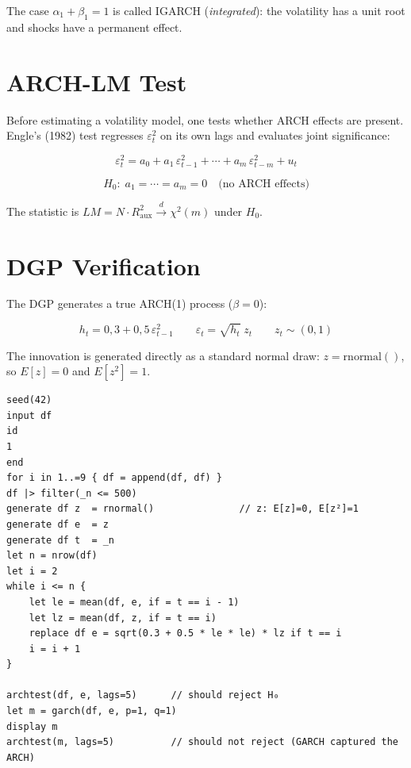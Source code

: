 The case $\alpha_1 + \beta_1 = 1$ is called IGARCH (\emph{integrated}): the
volatility has a unit root and shocks have a permanent effect.

\section{ARCH-LM Test}

Before estimating a volatility model, one tests whether ARCH effects are
present. Engle's (1982) test regresses $\varepsilon_t^2$ on its own lags and
evaluates joint significance:

\[
  \varepsilon_t^2 = a_0 + a_1\,\varepsilon_{t-1}^2 + \cdots + a_m\,\varepsilon_{t-m}^2 + u_t
\]

\[
  H_0{:}\; a_1 = \cdots = a_m = 0
  \quad \text{(no ARCH effects)}
\]

The statistic is $LM = N \cdot R^2_{\text{aux}} \xrightarrow{d} \chi^2(m)$
under $H_0$.

\section{DGP Verification}

The DGP generates a true ARCH(1) process ($\beta=0$):

\[
  h_t = 0{,}3 + 0{,}5\,\varepsilon_{t-1}^2
  \qquad
  \varepsilon_t = \sqrt{h_t}\; z_t
  \qquad
  z_t \sim (0,1)
\]

The innovation is generated directly as a standard normal draw:
$z = \text{rnormal}()$, so $E[z]=0$ and $E[z^2]=1$.

\begin{lstlisting}[caption={ARCH(1) DGP and GARCH estimation}]
seed(42)
input df
id
1
end
for i in 1..=9 { df = append(df, df) }
df |> filter(_n <= 500)
generate df z  = rnormal()               // z: E[z]=0, E[z²]=1
generate df e  = z
generate df t  = _n
let n = nrow(df)
let i = 2
while i <= n {
    let le = mean(df, e, if = t == i - 1)
    let lz = mean(df, z, if = t == i)
    replace df e = sqrt(0.3 + 0.5 * le * le) * lz if t == i
    i = i + 1
}

archtest(df, e, lags=5)      // should reject H₀
let m = garch(df, e, p=1, q=1)
display m
archtest(m, lags=5)          // should not reject (GARCH captured the ARCH)
\end{lstlisting}

